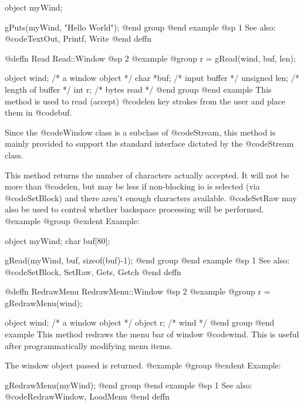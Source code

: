 object  myWind;

gPuts(myWind, "Hello World\n");
@end group
@end example
@sp 1
See also:  @code{TextOut, Printf, Write}
@end deffn











@deffn {Read} Read::Window
@sp 2
@example
@group
r = gRead(wind, buf, len);

object   wind;  /*  a window object       */
char    *buf;   /*  input buffer          */
unsigned len;   /*  length of buffer      */
int      r;     /*  bytes read            */
@end group
@end example
This method is used to read (accept) @code{len} key strokes from the user
and place them in @code{buf}.

Since the @code{Window} class is a subclass of @code{Stream}, this
method is mainly provided to support the standard interface dictated by
the @code{Stream} class.

This method returns the number of characters actually accepted.  It will
not be more than @code{len}, but may be less if non-blocking io is selected
(via @code{SetBlock}) and there aren't enough characters available.
@code{SetRaw} may also be used to control whether backspace processing will
be performed.
@example
@group
@exdent Example:

object  myWind;
char    buf[80];

gRead(myWind, buf, sizeof(buf)-1);
@end group
@end example
@sp 1
See also:  @code{SetBlock, SetRaw, Gets, Getch}
@end deffn














@deffn {RedrawMenu} RedrawMenu::Window
@sp 2
@example
@group
r = gRedrawMenu(wind);

object  wind;   /*  a window object  */
object  r;      /*  wind             */
@end group
@end example
This method redraws the menu bar of window @code{wind}.  This is
useful after programmatically modifying menu items.

The window object passed is returned.
@example
@group
@exdent Example:

gRedrawMenu(myWind);
@end group
@end example
@sp 1
See also:  @code{RedrawWindow, LoadMenu}
@end deffn




